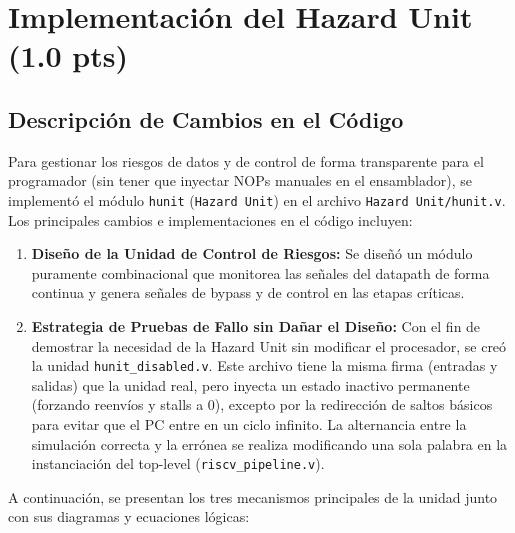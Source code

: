 \documentclass[12pt, a4paper]{article}
\begin{document}
\section{Implementación del Hazard Unit (1.0 pts)}

\subsection{Descripción de Cambios en el Código}

Para gestionar los riesgos de datos y de control de forma transparente para el programador (sin tener que inyectar NOPs manuales en el ensamblador), se implementó el módulo \texttt{hunit} (\texttt{Hazard Unit}) en el archivo \texttt{Hazard Unit/hunit.v}. Los principales cambios e implementaciones en el código incluyen:

\begin{enumerate}
  \item \textbf{Diseño de la Unidad de Control de Riesgos:} Se diseñó un módulo puramente combinacional que monitorea las señales del datapath de forma continua y genera señales de bypass y de control en las etapas críticas.
  \item \textbf{Estrategia de Pruebas de Fallo sin Dañar el Diseño:} Con el fin de demostrar la necesidad de la Hazard Unit sin modificar el procesador, se creó la unidad \texttt{hunit\_disabled.v}. Este archivo tiene la misma firma (entradas y salidas) que la unidad real, pero inyecta un estado inactivo permanente (forzando reenvíos y stalls a 0), excepto por la redirección de saltos básicos para evitar que el PC entre en un ciclo infinito. La alternancia entre la simulación correcta y la errónea se realiza modificando una sola palabra en la instanciación del top-level (\texttt{riscv\_pipeline.v}).
\end{enumerate}

A continuación, se presentan los tres mecanismos principales de la unidad junto con sus diagramas y ecuaciones lógicas:
\end{document}
